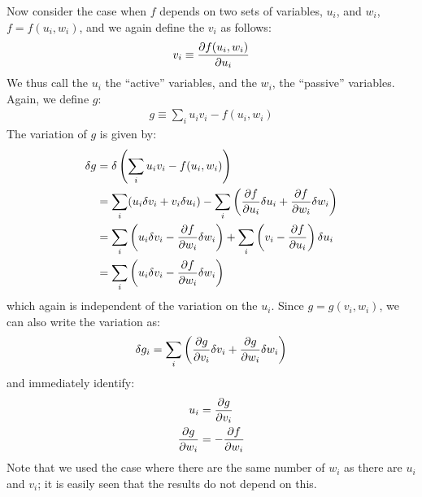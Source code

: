 Now consider the case when $f$ depends on two sets of variables, $u_i$, and $w_i$, $f=f(u_i,w_i)$, and we again define the $v_i$ as follows:
\begin{align}
v_i\equiv \frac{\partial f(u_i,w_i)}{\partial u_i}
\end{align}
We thus call the $u_i$ the ``active'' variables, and the $w_i$, the ``passive'' variables.
Again, we define $g$:
\begin{align}
g \equiv \sum_i u_iv_i-f(u_i,w_i)
\end{align}
The variation of $g$ is given by:
\begin{align}
\delta g &= \delta \left(\sum_i u_iv_i-f(u_i,w_i)\right)\nonumber\\
&=\sum_i (u_i\delta v_i+v_i\delta u_i)-\sum_i \left(\frac{\partial f}{\partial u_i}\delta u_i+ \frac{\partial f}{\partial w_i}\delta w_i\right) \nonumber\\
&=\sum_i \left(u_i\delta v_i-\frac{\partial f}{\partial w_i}\delta w_i\right) + \sum_i\left(v_i-\frac{\partial f}{\partial u_i} \right)\delta u_i\nonumber\\
&=\sum_i \left( u_i\delta v_i-\frac{\partial f}{\partial w_i}\delta w_i \right)
\end{align}
which again is independent of the variation on the $u_i$. Since $g=g(v_i,w_i)$, we can also write the variation as:
\begin{align}
\delta g_i = \sum_i \left(\frac{\partial g}{\partial v_i}\delta v_i+\frac{\partial g}{\partial w_i} \delta w_i \right)
\end{align}
and immediately identify:
\begin{align}
u_i&=\frac{\partial g}{\partial v_i}\nonumber\\
\frac{\partial g}{\partial w_i}&=-\frac{\partial f}{\partial w_i}
\end{align}
Note that we used the case where there are the same number of $w_i$ as there are $u_i$ and $v_i$; it is easily seen that the results do not depend on this. 


